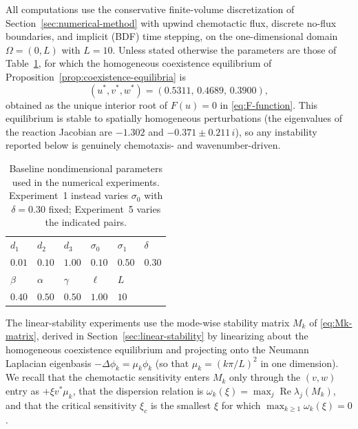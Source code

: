 \documentclass[a4paper,fleqn,longmktitle]{cas-sc}
\theoremstyle{plain}
\theoremstyle{definition}
\numberwithin{equation}{section}
\begin{document}
All computations use the conservative finite-volume discretization of
Section~\ref{sec:numerical-method} with upwind chemotactic flux, discrete no-flux
boundaries, and implicit (BDF) time stepping, on the one-dimensional domain
$\Omega=(0,L)$ with $L=10$. Unless stated otherwise the parameters are those of
Table~\ref{tab:experiment-parameters}, for which the homogeneous coexistence
equilibrium of Proposition~\ref{prop:coexistence-equilibria} is
\begin{equation}\label{eq:numeric-coexistence}
(u^*,v^*,w^*)=(0.5311,\,0.4689,\,0.3900),
\end{equation}
obtained as the unique interior root of $F(u)=0$ in \eqref{eq:F-function}. This
equilibrium is stable to spatially homogeneous perturbations (the eigenvalues of
the reaction Jacobian are $-1.302$ and $-0.371\pm0.211\,i$), so any instability
reported below is genuinely chemotaxis- and wavenumber-driven.

\begin{table}[htbp]
\centering
\caption{Baseline nondimensional parameters used in the numerical experiments.
Experiment~1 instead varies $\sigma_0$ with $\delta=0.30$ fixed; Experiment~5
varies the indicated pairs.}
\label{tab:experiment-parameters}
\begin{tabular}{llllll}
\toprule
$d_1$ & $d_2$ & $d_3$ & $\sigma_0$ & $\sigma_1$ & $\delta$ \\
$0.01$ & $0.10$ & $1.00$ & $0.10$ & $0.50$ & $0.30$ \\
\midrule
$\beta$ & $\alpha$ & $\gamma$ & $\ell$ & $L$ & \\
$0.40$ & $0.50$ & $0.50$ & $1.00$ & $10$ & \\
\bottomrule
\end{tabular}
\end{table}

The linear-stability experiments use the mode-wise stability matrix $M_k$ of
\eqref{eq:Mk-matrix}, derived in Section~\ref{sec:linear-stability} by
linearizing about the homogeneous coexistence equilibrium and projecting onto the
Neumann Laplacian eigenbasis $-\Delta\phi_k=\mu_k\phi_k$ (so that
$\mu_k=(k\pi/L)^2$ in one dimension). We recall that the chemotactic sensitivity
enters $M_k$ only through the $(v,w)$ entry as $+\xi v^*\mu_k$, that the
dispersion relation is $\omega_k(\xi)=\max_j\operatorname{Re}\lambda_j(M_k)$, and
that the critical sensitivity $\xi_c$ is the smallest $\xi$ for which
$\max_{k\ge1}\omega_k(\xi)=0$.

\end{document}
